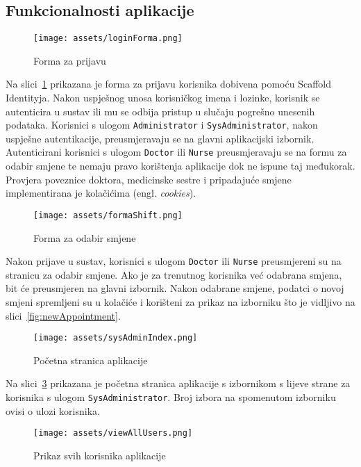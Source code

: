 \subsection{Funkcionalnosti aplikacije}

\begin{figure}[H]
	\texttt{[image: assets/loginForma.png]}
	\centering
	\caption{Forma za prijavu}
	\label{fig:loginForm}
\end{figure}

Na slici~\ref{fig:loginForm} prikazana je forma za prijavu korisnika dobivena pomoću Scaffold Identityja. Nakon uspješnog unosa korisničkog imena i lozinke, korisnik se autenticira u sustav ili mu se odbija pristup u slučaju pogrešno unesenih podataka. Korisnici s ulogom \texttt{Administrator} i \texttt{SysAdministrator}, nakon uspješne autentikacije, preusmjeravaju se na glavni aplikacijski izbornik. Autenticirani korisnici s ulogom \texttt{Doctor} ili \texttt{Nurse} preusmjeravaju se na formu za odabir smjene te nemaju pravo korištenja aplikacije dok ne ispune taj međukorak. Provjera poveznice doktora, medicinske sestre i pripadajuće smjene implementirana je kolačićima (engl. \textit{cookies}).

\begin{figure}[H]
	\texttt{[image: assets/formaShift.png]}
	\centering
	\caption{Forma za odabir smjene}
	\label{fig:shiftForm}
\end{figure}

Nakon prijave u sustav, korisnici s ulogom \texttt{Doctor} ili \texttt{Nurse} preusmjereni su na stranicu za odabir smjene. Ako je za trenutnog korisnika već odabrana smjena, bit će preusmjeren na glavni izbornik. Nakon odabrane smjene, podatci o novoj smjeni spremljeni su u kolačiće i korišteni za prikaz na izborniku što je vidljivo na slici~\ref{fig:newAppointment}.

\begin{figure}[H]
	\texttt{[image: assets/sysAdminIndex.png]}
	\centering
	\caption{Početna stranica aplikacije}
	\label{fig:homePage}
\end{figure}

Na slici~\ref{fig:homePage} prikazana je početna stranica aplikacije s izbornikom s lijeve strane za korisnika s ulogom \texttt{SysAdministrator}. Broj izbora na spomenutom izborniku ovisi o ulozi korisnika.

\begin{figure}[H]
	\texttt{[image: assets/viewAllUsers.png]}
	\centering
	\caption{Prikaz svih korisnika aplikacije}
	\label{fig:allUsers}
\end{figure}

